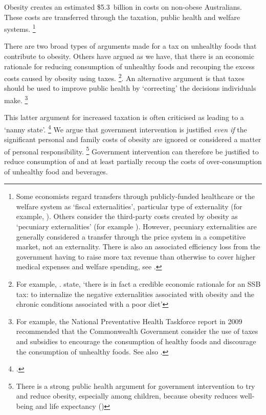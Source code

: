 \documentclass[embargoed]{grattan}
\begin{document}
Obesity creates an estimated \$5.3~billion in costs on non-obese Australians.
These costs are transferred through the taxation, public health and welfare systems.%
\footnote{Some economists regard transfers through publicly-funded healthcare or the welfare system as `fiscal externalities', particular type of externality (for example, \textcite{Browning1999mythfiscalexternalities}).
Others consider the third-party costs created by obesity as `pecuniary externalities' (for example \textcite{Commission2010ChildhoodObesityEconomic}).
However, pecuniary externalities are generally considered a transfer through the price system in a competitive market, not an externality.
There is also an associated efficiency loss from the government having to raise more tax revenue than otherwise to cover higher medical expenses and welfare spending, see \textcite{Daley2015Propertytaxes}.}

There are two broad types of arguments made for a tax on unhealthy foods that contribute to obesity.
Others have argued as we have, that there is an economic rationale for reducing consumption of unhealthy foods and recouping the excess costs caused by obesity using taxes.%
\footnote{For example, \textcites{Veerman2016ImpactTaxSugar}{Karnani2016ObesityCrisisas}{Cawley2012medicalcarecosts}{Parks2012MarginalExternalCost}. \textcite{Cawley2015IncidenceTaxesSugar} state, `there is in fact a credible economic rationale for an SSB tax: to internalize the negative externalities associated with obesity and the chronic conditions associated with a poor diet'}.
An alternative argument is that taxes should be used to improve public health by `correcting' the decisions individuals make.%
\footnote{For example, the National Preventative Health Taskforce report in 2009 recommended that the Commonwealth Government consider the use of taxes and subsidies to encourage the consumption of healthy foods and discourage the consumption of unhealthy foods.
See also \textcites{Powell2013Assessingpotentialeffectiveness}{Organisation2015Usingpricepolicies}{Thow2014systematicrevieweffectiveness}{Sassi2013rolefiscalpolicies}.}

This latter argument for increased taxation is often criticised as leading to a `nanny state'.%
\footcites{Novak2012Nannystatetaxes}{Keane2016Sugarohhoney}{Lesh2016Greenssoftdrinks}{Elliott2016TomElliottsays} We argue that government intervention is justified \emph{even if} the significant personal and family costs of obesity are ignored or considered a matter of personal responsibility.%
\footnote{There is a strong public health argument for government intervention to try and reduce obesity, especially among children, because obesity reduces well-being and life expectancy (\textcites{Roberto2015Patchyprogressobesity}{Waters2011Interventionspreventingobesity}{Ewart-Pierce2016WholeCommunityObesity})} Government intervention can therefore be justified to reduce consumption of and at least partially recoup the costs of over-consumption of unhealthy food and beverages.
\end{document}
